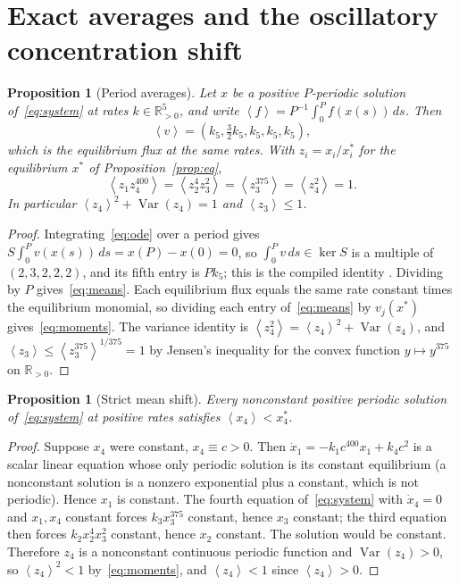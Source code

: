 \documentclass[11pt,a4paper]{article}
\theoremstyle{plain}
\newtheorem{proposition}[theorem]{Proposition}
\theoremstyle{definition}
\theoremstyle{remark}
\newcommand{\R}{\mathbb{R}}
\newcommand{\Var}{\operatorname{Var}}
\newcommand{\av}[1]{\left\langle #1\right\rangle}
\newcommand{\xs}{x^{*}}
\begin{document}
\section{Exact averages and the oscillatory concentration shift}\label{sec:means}

\begin{proposition}[Period averages]\label{prop:means}
Let $x$ be a positive $P$-periodic solution of~\eqref{eq:system} at rates $k\in\R_{>0}^5$, and write $\av f=P^{-1}\int_0^Pf(x(s))\,ds$. Then
\begin{equation}\label{eq:means}
\av{v}=(k_5,\tfrac32k_5,k_5,k_5,k_5),
\end{equation}
which is the equilibrium flux at the same rates. With $z_i=x_i/x_i^*$ for the equilibrium $\xs$ of Proposition~\ref{prop:eq},
\begin{equation}\label{eq:moments}
\av{z_1z_4^{400}}=\av{z_2^4z_3^2}=\av{z_3^{375}}=\av{z_4^2}=1 .
\end{equation}
In particular $\av{z_4}^2+\Var(z_4)=1$ and $\av{z_3}\le1$.
\end{proposition}

\begin{proof}
Integrating~\eqref{eq:ode} over a period gives $S\int_0^Pv(x(s))\,ds=x(P)-x(0)=0$, so $\int_0^Pv\,ds\in\ker S$ is a multiple of $(2,3,2,2,2)$, and its fifth entry is $Pk_5$; this is the compiled identity . Dividing by $P$ gives~\eqref{eq:means}. Each equilibrium flux equals the same rate constant times the equilibrium monomial, so dividing each entry of~\eqref{eq:means} by $v_j(\xs)$ gives~\eqref{eq:moments}. The variance identity is $\av{z_4^2}=\av{z_4}^2+\Var(z_4)$, and $\av{z_3}\le\av{z_3^{375}}^{1/375}=1$ by Jensen's inequality for the convex function $y\mapsto y^{375}$ on $\R_{>0}$.
\end{proof}

\begin{proposition}[Strict mean shift]\label{prop:shift}
Every nonconstant positive periodic solution of~\eqref{eq:system} at positive rates satisfies $\av{x_4}<x_4^*$.
\end{proposition}

\begin{proof}
Suppose $x_4$ were constant, $x_4\equiv c>0$. Then $\dot x_1=-k_1c^{400}x_1+k_4c^2$ is a scalar linear equation whose only periodic solution is its constant equilibrium (a nonconstant solution is a nonzero exponential plus a constant, which is not periodic). Hence $x_1$ is constant. The fourth equation of~\eqref{eq:system} with $\dot x_4=0$ and $x_1,x_4$ constant forces $k_3x_3^{375}$ constant, hence $x_3$ constant; the third equation then forces $k_2x_2^4x_3^2$ constant, hence $x_2$ constant. The solution would be constant. Therefore $z_4$ is a nonconstant continuous periodic function and $\Var(z_4)>0$, so $\av{z_4}^2<1$ by~\eqref{eq:moments}, and $\av{z_4}<1$ since $\av{z_4}>0$.
\end{proof}
\end{document}
